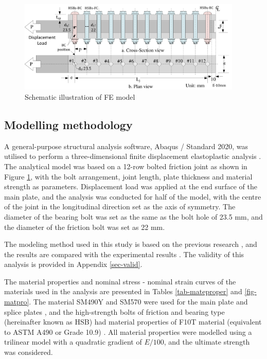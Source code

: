 \begin{figure}[htbp]
    \centering
    \includegraphics[width=0.95\textwidth]{imgs/ch7/femodelsize.pdf}
    \caption{Schematic illustration of FE model}
    \label{fig-modelsize}
\end{figure}

\subsection{Modelling methodology}

A general-purpose structural analysis software, Abaqus / Standard 2020, was utilised to perform a three-dimensional finite displacement elastoplastic analysis \cite{Smith2020}. The analytical model was based on a 12-row bolted friction joint as shown in Figure \ref{fig-modelsize}, with the bolt arrangement, joint length, plate thickness and material strength as parameters. Displacement load was applied at the end surface of the main plate, and the analysis was conducted for half of the model, with the centre of the joint in the longitudinal direction set as the axis of symmetry. The diameter of the bearing bolt was set as the same as the bolt hole of 23.5 mm, and the diameter of the friction bolt was set as 22 mm.

The modeling method used in this study is based on the previous research \cite{chen2023mecha}, and the results are compared with the experimental results \cite{chen2024Exp}. The validity of this analysis is provided in Appendix \ref{sec-valid}.

The material properties and nominal stress - nominal strain curves of the materials used in the analysis are presented in Tables \ref{tab-mateproper} and \ref{fig-matpro}. The material SM490Y and SM570 were used for the main plate and splice plates \cite{JISsteel}, and the high-strength bolts of friction and bearing type (hereinafter known as HSB) had material properties of F10T material \cite{JISbolt} (equivalent to ASTM A490 or Grade 10.9) \cite{ASTM-bolt,ISO-bolt}. All material properties were modelled using a trilinear model with a quadratic gradient of $E/100$, and the ultimate strength was considered.

